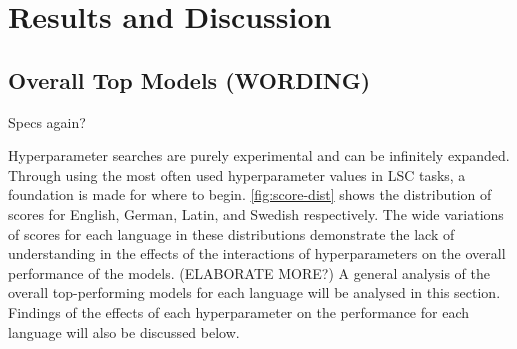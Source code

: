 \section{Results and Discussion}

\subsection{Overall Top Models (WORDING)}
Specs again?

Hyperparameter searches are purely experimental and can be infinitely expanded. Through using the most often used hyperparameter values in LSC tasks, a foundation is made for where to begin. \autoref{fig:score-dist} shows the distribution of scores for English, German, Latin, and Swedish respectively. The wide variations of scores for each language in these distributions demonstrate the lack of understanding in the effects of the interactions of hyperparameters on the overall performance of the models. (ELABORATE MORE?) A general analysis of the overall top-performing models for each language will be analysed in this section. Findings of the effects of each hyperparameter on the performance for each language will also be discussed below. 

